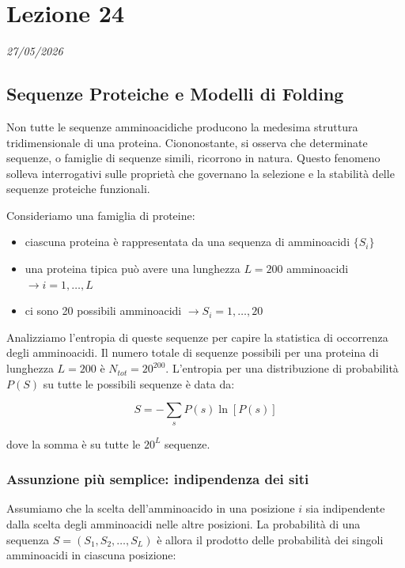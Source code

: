 \chapter{Lezione 24}
\label{capitolo_24}
\textit{27/05/2026}

\section{Sequenze Proteiche e Modelli di Folding}
Non tutte le sequenze amminoacidiche producono la medesima struttura tridimensionale di una proteina. Ciononostante, si osserva che determinate sequenze, o famiglie di sequenze simili, ricorrono in natura. Questo fenomeno solleva interrogativi sulle proprietà che governano la selezione e la stabilità delle sequenze proteiche funzionali.



Consideriamo una famiglia di proteine:
\begin{itemize}
    \item ciascuna proteina è rappresentata da una sequenza di amminoacidi $\{S_i\}$
    \item una proteina tipica può avere una lunghezza $L=200$ amminoacidi $\longrightarrow i=1, \dots, L$
    \item ci sono 20 possibili amminoacidi $\longrightarrow S_i=1, \dots, 20$
\end{itemize}

Analizziamo l'entropia di queste sequenze per capire la statistica di occorrenza degli amminoacidi.
Il numero totale di sequenze possibili per una proteina di lunghezza $L=200$ è $N_{tot} = 20^{200}$.
L'entropia per una distribuzione di probabilità $P(S)$ su tutte le possibili sequenze è data da:

\begin{equation} \label{eq:ch24_1}
S = -\sum_s P(s) \ln[P(s)]
\end{equation}

dove la somma è su tutte le $20^L$ sequenze.

\subsection*{Assunzione più semplice: indipendenza dei siti}
Assumiamo che la scelta dell'amminoacido in una posizione $i$ sia indipendente dalla scelta degli amminoacidi nelle altre posizioni. La probabilità di una sequenza $S = (S_1, S_2, \dots, S_L)$ è allora il prodotto delle probabilità dei singoli amminoacidi in ciascuna posizione:

